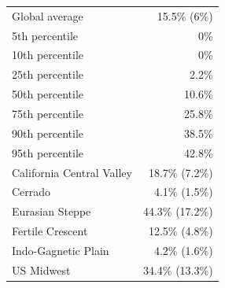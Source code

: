 
\begin{tabular}{lr}
\toprule
Global average & 15.5\% (6\%)\\
5th percentile & 0\%\\
10th percentile & 0\%\\
25th percentile & 2.2\%\\
50th percentile & 10.6\%\\
\addlinespace
75th percentile & 25.8\%\\
90th percentile & 38.5\%\\
95th percentile & 42.8\%\\
California Central Valley & 18.7\% (7.2\%)\\
Cerrado & 4.1\% (1.5\%)\\
\addlinespace
Eurasian Steppe & 44.3\% (17.2\%)\\
Fertile Crescent & 12.5\% (4.8\%)\\
Indo-Gagnetic Plain & 4.2\% (1.6\%)\\
US Midwest & 34.4\% (13.3\%)\\
\bottomrule
\end{tabular}
